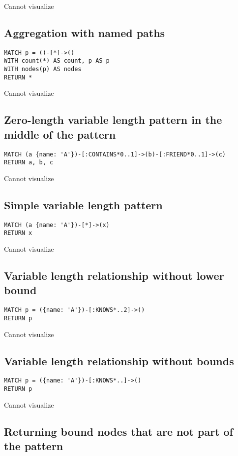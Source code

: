 Cannot visualize
\subsection{Aggregation with named paths}

\begin{lstlisting}
MATCH p = ()-[*]->()
WITH count(*) AS count, p AS p
WITH nodes(p) AS nodes
RETURN *
\end{lstlisting}

Cannot visualize
\subsection{Zero-length variable length pattern in the middle of the pattern}

\begin{lstlisting}
MATCH (a {name: 'A'})-[:CONTAINS*0..1]->(b)-[:FRIEND*0..1]->(c)
RETURN a, b, c
\end{lstlisting}

Cannot visualize
\subsection{Simple variable length pattern}

\begin{lstlisting}
MATCH (a {name: 'A'})-[*]->(x)
RETURN x
\end{lstlisting}

Cannot visualize
\subsection{Variable length relationship without lower bound}

\begin{lstlisting}
MATCH p = ({name: 'A'})-[:KNOWS*..2]->()
RETURN p
\end{lstlisting}

Cannot visualize
\subsection{Variable length relationship without bounds}

\begin{lstlisting}
MATCH p = ({name: 'A'})-[:KNOWS*..]->()
RETURN p
\end{lstlisting}

Cannot visualize
\subsection{Returning bound nodes that are not part of the pattern}

